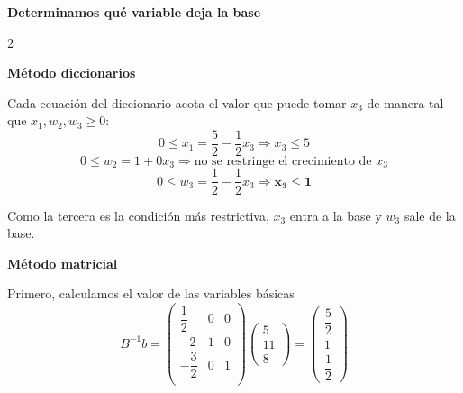 \documentclass{article}
\newcommand{\binv}{B^{-1}}
\begin{document}
        \begin{center}
        \textbf{Determinamos qué variable deja la base}
    \end{center}
    \begin{multicols}{2}
        \raggedcolumns
        \begin{center}
            \textbf{Método diccionarios}
        \end{center}

        Cada ecuación del diccionario acota el valor que puede tomar $x_3$ de manera tal que $x_1, w_2, w_3 \geq 0$:
        \[ 0\leq x_1 = \frac{5}{2}-\frac{1}{2}x_3 \Rightarrow x_3 \leq 5 \]
        \[ 0\leq w_2 = 1+0x_3 \Rightarrow \text{no se restringe el crecimiento de $x_3$} \]
        \[ 0\leq w_3 = \frac{1}{2}-\frac{1}{2}x_3 \Rightarrow \mathbf{x_3 \leq 1} \]

        Como la tercera es la condición más restrictiva, $x_3$ entra a la base y $w_3$ sale de la base.

        \columnbreak
        \begin{center}
            \textbf{Método matricial}
        \end{center}

        Primero, calculamos el valor de las variables básicas
        \[\binv b =         \begin{pmatrix}
                \dfrac{1}{2} & 0 & 0 \\
                -2 & 1 & 0 \\
                -\dfrac{3}{2} & 0 & 1 \\
        \end{pmatrix}
        \begin{pmatrix}
            5 \\
            11 \\
            8
        \end{pmatrix} =
        \begin{pmatrix}
            \dfrac{5}{2} \\
            1 \\
            \dfrac{1}{2}
        \end{pmatrix}
        \]


\end{multicols}
\end{document}
